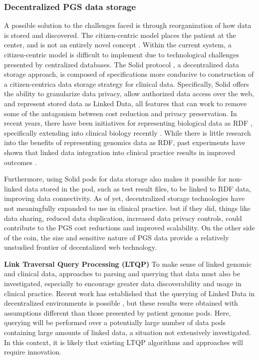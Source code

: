 \documentclass[a4paper,11pt]{article}
\begin{document}
\subsubsection{Decentralized PGS data storage}
A possible solution to the challenges faced is through reorganization of how data is stored and discovered. 
The citizen-centric model places the patient at the center, and is not an entirely novel concept \cite{brands_patient-centered_2022}.
Within the current system, a citizen-centric model is difficult to implement due to technological challenges presented by centralized databases.
The Solid protocol \cite{capadisli_solid_nodate}, a decentralized data storage approach, is composed of specifications more conducive to construction of a citizen-centrica data storage strategy for clinical data.
Specifically, Solid offers the ability to granularize data privacy, allow authorized data access over the web, and represent stored data as Linked Data, all features that can work to remove some of the antagonism between cost reduction and privacy preservation.
In recent years, there have been initiatives for representing biological data as RDF \cite{sib_swiss_institute_of_bioinformatics_rdf_group_members_sib_2024}, specifically extending into clinical biology recently \cite{van_der_horst_bridging_2023}. 
While there is little research into the benefits of representing genomics data as RDF, past experiments have shown that linked data integration into clinical practice results in improved outcomes \cite{farinelli_linked_2015}.

Furthermore, using Solid pods for data storage also makes it possible for non-linked data stored in the pod, such as test result files, to be linked to RDF data, improving data connectivity.
As of yet, decentralized storage technologies have not meaningfully expanded to use in clinical practice.
but if they did, things like data sharing, reduced data duplication, increased data privacy controls, could contribute to the PGS cost reductions and improved scalability.
On the other side of the coin, the size and sensitive nature of PGS data provide a relatively unstudied frontier of decentalized web technology.

\textbf{Link Traversal Query Processing (LTQP)}
To make sense of linked genomic and clinical data, approaches to parsing and querying that data must also be investigated, especially to encourage greater data discoverability and usage in clinical practice.
Recent work has established that the querying of Linked Data in decentralized environments is possible \cite{taelman_evaluation_2023}, but these results were obtained with assumptions different than those presented by patient genome pods.
Here, querying will be performed over a potentially large number of data pods containing large amounts of linked data, a situation not extensively investigated. In this context, it is likely that existing LTQP algorithms and approaches will require innovation. 
\end{document}
